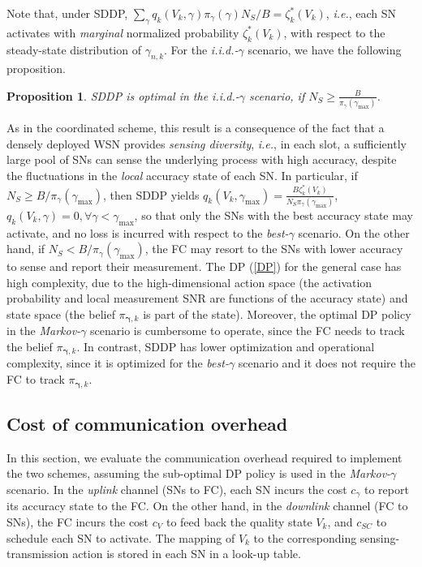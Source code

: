 \documentclass[10pt,twocolumn,twoside]{IEEEtran}
\newtheorem{propos}{Proposition}
\theoremstyle{plain}
\begin{document}
\noindent Note that, under SDDP,
$\sum_{\gamma}q_k(V_k,\gamma)\pi_{\gamma}(\gamma)N_S/B{=}\zeta_k^{*}(V_k)$,
\emph{i.e.}, each SN activates with \emph{marginal} normalized probability $\zeta_k^{*}(V_k)$,
with respect to the steady-state distribution of $\gamma_{n,k}$.
For the \emph{i.i.d.-}$\gamma$ scenario, we have the following proposition.
\vspace{-3mm}
\begin{propos}
SDDP is optimal in the \emph{i.i.d.-}$\gamma$ scenario,
if $N_S{\geq}\frac{B}{\pi_\gamma(\gamma_{\max})}$.
\end{propos}
As in the coordinated scheme, this result is a consequence of the fact that a densely deployed WSN
 provides \emph{sensing diversity}, \emph{i.e.}, in each slot, a sufficiently large pool of SNs
can sense the underlying process with high accuracy, despite the fluctuations in the \emph{local} accuracy state of each SN.
In particular, if $N_S{\geq}B/\pi_\gamma(\gamma_{\max})$,
then SDDP yields $q_k(V_k,\gamma_{\max})=\frac{B\zeta_k^{*}(V_k)}{N_S\pi_{\gamma}(\gamma_{\max})}$,
$q_k(V_k,\gamma)=0,\forall\gamma<\gamma_{\max}$, so that only the SNs with the best accuracy state may activate, and no loss is incurred with respect to
the \emph{best-}$\gamma$ scenario.
On the other hand, if $N_S{<}B/\pi_\gamma(\gamma_{\max})$,
the FC may resort to the SNs with lower accuracy to sense and report their measurement.
The DP (\ref{DP}) for the general case has high complexity, due
 to the high-dimensional action space (the activation probability and local measurement SNR are functions of the accuracy state) and state space
(the belief $\pi_{\boldsymbol\gamma,k}$ is part of the state).
 Moreover, the optimal DP policy in the \emph{Markov-}$\gamma$ scenario is cumbersome  to operate, since the FC needs to track the 
belief $\pi_{\boldsymbol\gamma,k}$.
In contrast, SDDP has lower optimization and operational complexity, since it is optimized for the \emph{best-}$\gamma$ scenario and
it does not require the FC to track $\pi_{\boldsymbol\gamma,k}$.
\vspace{-0.3cm}
\subsection{Cost of communication overhead}
\label{commover}
\noindent In this section, we evaluate the communication overhead required to implement the two schemes,
assuming the sub-optimal DP policy is used in the \emph{Markov-}$\gamma$ scenario.
In the \emph{uplink} channel (SNs to FC), each SN incurs the cost $c_{\gamma}$ to report its accuracy state to the FC. 
On the other hand, in the
\emph{downlink} channel (FC to SNs), the FC incurs the cost $c_{V}$ to feed back the quality state $V_k$, and $c_{SC}$ to schedule each SN to activate. 
The mapping of $V_k$ to the corresponding sensing-transmission action is stored in each SN in a look-up table.
\end{document}

